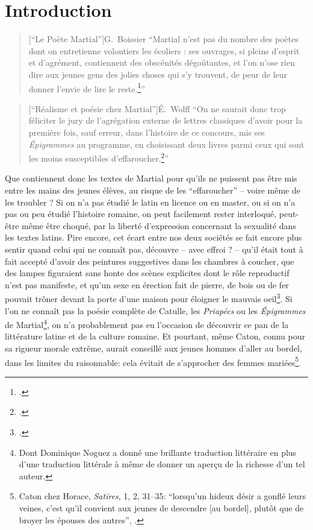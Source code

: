\chapter*{Introduction}
\label{intro}

\begin{quote}[\enquote{Le Poète Martial}]{G.~Boissier}
    \enquote{Martial n’est pas du nombre des poètes dont on entretienne volontiers les écoliers : ses ouvrages, si pleins d’esprit et d’agrément, contiennent des obscénités dégoûtantes, et l’on n’ose rien dire aux jeunes gens des jolies choses qui s’y trouvent, de peur de leur donner l’envie de lire le reste.\footcite{boissier_poete_1900}}
\end{quote}

\begin{quote}[\enquote{Réalisme et poésie chez Martial}]{É.~Wolff}
    \enquote{On ne saurait donc trop féliciter le jury de l'agrégation externe de lettres classiques d'avoir pour la première fois, sauf erreur, dans l'histoire de ce concours, mis ses \textit{Épigrammes} au programme, en choisissant deux livres parmi ceux qui sont les moins susceptibles d'effaroucher.\footcite{wolff_realisme_1997}}
\end{quote}

Que contiennent donc les textes de Martial pour qu'ils ne puissent pas être mis entre les mains des jeunes élèves, au risque de les \enquote{effaroucher} -- voire même de les troubler ? Si on n'a pas étudié le latin en licence ou en master, ou si on n'a pas ou peu étudié l'histoire romaine, on peut facilement rester interloqué, peut-être même être choqué, par la liberté d'expression concernant la sexualité dans les textes latins. Pire encore, cet écart entre nos deux sociétés se fait encore plus sentir quand celui qui ne connaît pas, découvre -- avec effroi ? -- qu'il était tout à fait accepté d'avoir des peintures suggestives dans les chambres à coucher, que des lampes figuraient sans honte des scènes explicites dont le rôle reproductif n'est pas manifeste, et qu'un sexe en érection fait de pierre, de bois ou de fer pouvait trôner devant la porte d'une maison pour éloigner le mauvais oeil\footcite{parker_bells_2018}. Si l'on ne connaît pas la poésie complète de Catulle, les \textit{Priapées} ou les \textit{Épigrammes} de Martial\footnote{Dont Dominique Noguez a donné une brillante traduction littéraire en plus d'une traduction littérale à même de donner un aperçu de la richesse d'un tel auteur.}, on n'a probablement pas eu l'occasion de découvrir ce pan de la littérature latine et de la culture romaine. Et pourtant, même Caton, connu pour sa rigueur morale extrême, aurait conseillé aux jeunes hommes d'aller au bordel, dans les limites du raisonnable: cela évitait de s'approcher des femmes mariées\footnote{Caton chez Horace, \textit{Satires}, 1, 2, 31--35: \enquote{lorsqu'un hideux désir a gonflé leurs veines, c'est qu'il convient aux jeunes de descendre [au bordel], plutôt que de broyer les épouses des autres}, \textcite[p.~30]{puccini_delbey_vie_2010}.}.

